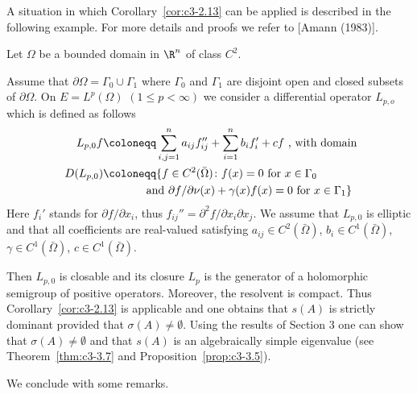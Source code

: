 A situation in which Corollary~\ref{cor:c3-2.13} can be applied is described in the following example.
For more details and proofs we refer to [Amann (1983)].
\begin{example}\label{ex:c3-2.14}
	Let $\Omega$ be a bounded domain in $\R ^{n}$ of class $C^{2}$.
	
	Assume that $\partial\Omega = \Gamma_{0}\cup\Gamma_{1}$ where $\Gamma_{0}$ and $\Gamma_{1}$ are disjoint open and
%
%
closed subsets of $\partial\Omega$.
On $E = L^{p}(\Omega)$ $(1 \leq p < \infty)$ we consider a differential operator $L_{p,o}$ which is defined as follows
\begin{equation}\label{eq:c3-2.23}
	\begin{aligned}
\text{$L_{p,0}f$} &\text{$\coloneqq \sum_{i,j=1}^{n} a_{ij} f_{ij}'' + \sum_{i=1}^{n} b_{i} f_{i}' + cf$ , with domain} \\
\text{ $D(L_{p,0})$} & \text{$\coloneqq \{f \in C^{2}(\bar{\Omega}) \colon$} 
\text{$ f(x) = 0$ for $x \in \Gamma_{0}$}\\ 
& \text{\phantom{aaaaaaa} and $\partial f/\partial\nu (x) + \gamma(x)f(x) = 0$ for $x \in \Gamma_{1}\}$}
	\end{aligned}
\end{equation}
Here $f_{i}'$ stands for $\partial f/\partial x_{i}$, thus $f_{ij}'' = \partial^{2}f/\partial x_{i}\partial x_{j}$.
We assume that $L_{p,0}$ is elliptic and that all coefficients are real-valued satisfying $a_{ij} \in C^{2}(\bar{\Omega})$, $b_{i} \in C^{1}(\bar{\Omega})$, $\gamma \in C^{1}(\bar{\Omega})$, $c \in C^{1}(\bar{\Omega})$.

Then $L_{p,0}$ is closable and its closure $L_{p}$ is the generator of a holomorphic semigroup of positive operators.
Moreover, the resolvent is compact.
Thus Corollary~\ref{cor:c3-2.13} is applicable and one obtains that $s(A)$ is strictly dominant provided that $\sigma(A) \neq \emptyset$.
Using the results of Section 3 one can show that $\sigma(A) \neq \emptyset$ and that $s(A)$ is an algebraically simple eigenvalue (see Theorem~\ref{thm:c3-3.7} and Proposition~\ref{prop:c3-3.5}).
\end{example}

We conclude with some remarks.

